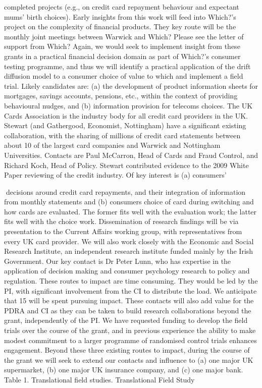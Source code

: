 \documentclass[11pt, a4paper]{article}
\begin{document}
completed projects (e.g., on credit card repayment behaviour and expectant mums’ birth
choices). Early insights from this work will feed into Which?’s project on the complexity of
financial products. They key route will be the monthly joint meetings between Warwick and
Which? Please see the letter of support from Which? Again, we would seek to implement
insight from these grants in a practical financial decision domain as part of Which?’s
consumer testing programme, and thus we will identify a practical application of the drift
diffusion model to a consumer choice of value to which and implement a field trial. Likely
candidates are: (a) the development of product information sheets for mortgages, savings
accounts, pensions, etc., within the context of providing behavioural nudges, and (b)
information provision for telecoms choices.
The UK Cards Association is the industry body for all credit card providers in the UK.
Stewart (and Gathergood, Economist, Nottingham) have a significant existing collaboration,
with the sharing of millions of credit card statements between about 10 of the largest card
companies and Warwick and Nottingham Universities. Contacts are Paul McCarron, Head of
Cards and Fraud Control, and Richard Koch, Head of Policy. Stewart contributed evidence to
the 2009 White Paper reviewing of the credit industry. Of key interest is (a) consumers’

decisions around credit card repayments, and their integration of information from monthly
statements and (b) consumers choice of card during switching and how cards are evaluated.
The former fits well with the evaluation work; the latter fits well with the choice work.
Dissemination of research findings will be via presentation to the Current Affairs working
group, with representatives from every UK card provider.
We will also work closely with the Economic and Social Research Institute, an independent
research institute funded mainly by the Irish Government. Our key contact is Dr Peter Lunn,
who has expertise in the application of decision making and consumer psychology research to
policy and regulation.
These routes to impact are time consuming. They would be led by the PI, with significant
involvement from the CI to distribute the load. We anticipate that 15%
will be spent pursuing impact. These contacts will also add value for the PDRA and CI as
they can be taken to build research collaborations beyond the grant, independently of the PI.
We have requested funding to develop the field trials over the course of the grant, and in
previous experience the ability to make modest commitment to a larger programme of
randomised control trials enhances engagement.
Beyond these three existing routes to impact, during the course of the grant we will seek to
extend our contacts and influence to (a) one major UK supermarket, (b) one major UK
insurance company, and (c) one major bank.
Table 1. Translational field studies.
Translational Field Study
\end{document}
